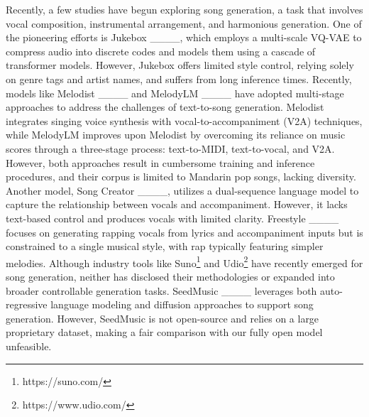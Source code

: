 Recently, a few studies have begun exploring song generation, a task that involves vocal composition, instrumental arrangement, and harmonious generation.
One of the pioneering efforts is Jukebox ____, which employs a multi-scale VQ-VAE to compress audio into discrete codes and models them using a cascade of transformer models.
However, Jukebox offers limited style control, relying solely on genre tags and artist names, and suffers from long inference times.
Recently, models like Melodist ____ and MelodyLM ____ have adopted multi-stage approaches to address the challenges of text-to-song generation. Melodist integrates singing voice synthesis with vocal-to-accompaniment (V2A) techniques, while MelodyLM improves upon Melodist by overcoming its reliance on music scores through a three-stage process: text-to-MIDI, text-to-vocal, and V2A. However, both approaches result in cumbersome training and inference procedures, and their corpus is limited to Mandarin pop songs, lacking diversity.
Another model, Song Creator ____, utilizes a dual-sequence language model to capture the relationship between vocals and accompaniment. However, it lacks text-based control and produces vocals with limited clarity. 
Freestyle ____ focuses on generating rapping vocals from lyrics and accompaniment inputs but is constrained to a single musical style, with rap typically featuring simpler melodies.
Although industry tools like Suno\footnote{https://suno.com/} and Udio\footnote{https://www.udio.com/} have recently emerged for song generation, neither has disclosed their methodologies or expanded into broader controllable generation tasks. SeedMusic ____ leverages both auto-regressive language modeling and diffusion approaches to support song generation. However, SeedMusic is not open-source and relies on a large proprietary dataset, making a fair comparison with our fully open model unfeasible.

